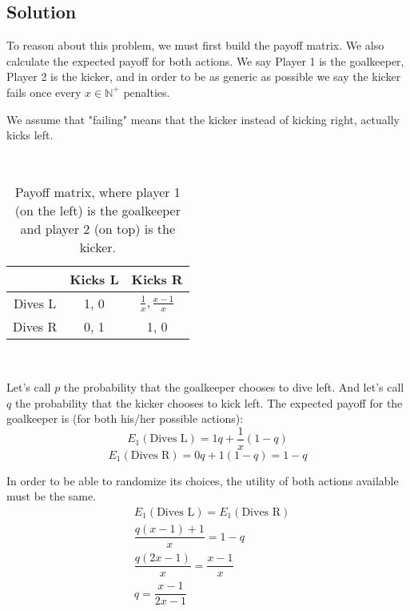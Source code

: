 \documentclass{article}
\begin{document}
\subsection{Solution}
To reason about this problem, we must first build the payoff matrix. We also calculate the
expected payoff for both actions. We say Player 1 is the goalkeeper, Player 2 is the kicker,
and in order to be as generic as possible we say the kicker fails once every
\(x \in \mathbb{N^+}\) penalties.

We assume that "failing" means that the kicker instead of kicking right, actually kicks left.

\

\begin{table}[h!]
    \centering
    \renewcommand{\arraystretch}{1.5} %
    \setlength{\tabcolsep}{15pt}      %
    {\Large %
    \begin{tabular}{|c|c|c|}
        \hline
        & Kicks L & Kicks R \\\hline
        Dives L &  1, 0 & \( \frac{1}{x}, \frac{x-1}{x} \) \\\hline
        Dives R & 0, 1 & 1, 0 \\\hline
    \end{tabular}
    }
    \caption{Payoff matrix, where player 1 (on the left) is the goalkeeper and player 2 (on top) is the kicker.}
    \label{tab:penalty-kick-game}
\end{table}

\

Let's call \(p\) the probability that the goalkeeper chooses to dive left. And let's call \(q\) the probability that the kicker chooses to kick left.
The expected payoff for the goalkeeper is (for both his/her possible actions):
\[
E_1(\text{Dives L}) = 1q + \frac{1}{x}(1-q)
\]
\[
E_1(\text{Dives R}) = 0q + 1(1-q) = 1 - q
\]

In order to be able to randomize its choices, the utility of both actions available must be
the same.
\[
	\begin{aligned}
        & E_1(\text{Dives L}) = E_1(\text{Dives R}) \\
        & \dfrac{q(x-1)+1}{x} = 1 - q \\
        & \dfrac{q(2x-1)}{x} = \dfrac{x-1}{x} \\
        & q = \dfrac{x-1}{2x-1}
	\end{aligned}
\]

\
\end{document}
